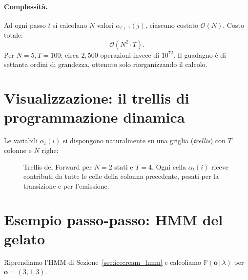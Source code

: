\documentclass[11pt,a4paper,oneside]{book}
\theoremstyle{plain}
\theoremstyle{definition}
\theoremstyle{remark}
\newcommand{\Prob}{\mathbb{P}}
\newcommand{\hmm}{\lambda}                   %
\newcommand{\Nstates}{N}                     %
\newcommand{\Tlen}{T}                        %
\newcommand{\seqobs}{\mathbf{o}}             %
\newcommand{\fwd}{\alpha}                    %
\newcommand{\given}{\,\vert\,}
\begin{document}
\paragraph{Complessità.} Ad ogni passo $t$ si calcolano $\Nstates$
valori $\fwd_{t+1}(j)$, ciascuno costato $\mathcal{O}(\Nstates)$. Costo
totale:
\[
    \mathcal{O}(\Nstates^2 \cdot \Tlen).
\]
Per $\Nstates=5, \Tlen=100$: circa $2{,}500$ operazioni invece di
$10^{72}$. Il guadagno è di settanta ordini di grandezza, ottenuto
solo riorganizzando il calcolo.

\section{Visualizzazione: il trellis di programmazione dinamica}

Le variabili $\fwd_t(i)$ si dispongono naturalmente su una griglia
(\emph{trellis}) con $\Tlen$ colonne e $\Nstates$ righe:

\begin{figure}[h!]
\centering
{}
\caption{Trellis del Forward per $\Nstates=2$ stati e $\Tlen=4$. Ogni
cella $\fwd_t(i)$ riceve contributi da tutte le celle della colonna
precedente, pesati per la transizione e per l'emissione.}
\label{fig:fwd_trellis}
\end{figure}

\section{Esempio passo-passo: HMM del gelato}\label{sec:fwd_example}

Riprendiamo l'HMM di Sezione~\ref{sec:icecream_hmm} e calcoliamo
$\Prob(\seqobs\given\hmm)$ per $\seqobs=(3,1,3)$.
\end{document}
